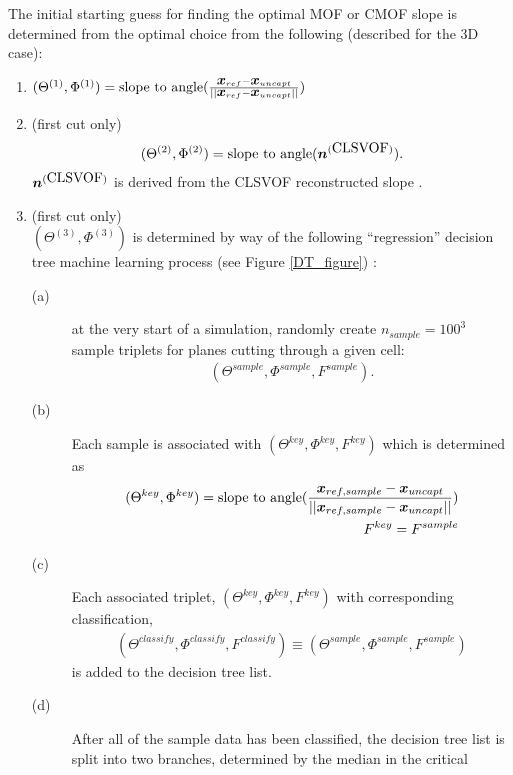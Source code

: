 \documentclass[]{article}
\newcommand{\bmx}{\mbox{\boldmath $x$\unboldmath}}
\newcommand{\bmn}{\mbox{\boldmath $n$\unboldmath}}
\begin{document}
The initial starting guess for finding the optimal MOF or CMOF
slope 
is determined from the optimal choice from the following (described
for the 3D case):
\begin{enumerate}
\item $(\Theta^{(1)},\Phi^{(1)})=\mbox{slope to angle}(\frac{\bmx_{ref}-\bmx_{uncapt}}{||\bmx_{ref}-\bmx_{uncapt}||})$
\item (first cut only) 
\begin{eqnarray}
(\Theta^{(2)},\Phi^{(2)})=\mbox{slope to angle}(\bmn^{(\mbox{CLSVOF})}).
\label{CLSVOFslope}
\end{eqnarray}
   $\bmn^{(\mbox{CLSVOF})}$ is derived from the CLSVOF 
   reconstructed slope \cite{sussman2000coupled}.
\item (first cut only) \\
   $(\Theta^{(3)},\Phi^{(3)})$ 
   is determined by way of the following 
   ``regression'' decision tree \cite{breiman1984classification}
   machine learning process
   (see Figure \ref{DT_figure}) :
   \begin{description}
   \item[(a)] at the very start of a simulation,
    randomly create 
    $n_{sample}=100^{3}$ 
    sample triplets for planes
    cutting through a given cell: 
    \begin{eqnarray*}
    (\Theta^{sample},\Phi^{sample},F^{sample}).  
    \end{eqnarray*}
   \item[(b)] Each sample is 
    associated with 
    $(\Theta^{key},\Phi^{key},F^{key})$ 
    which is determined as
    \begin{eqnarray*}
    (\Theta^{key},\Phi^{key})=
    \mbox{slope to angle}( \frac{\bmx_{ref,sample}-\bmx_{uncapt}}
       {||\bmx_{ref,sample}-\bmx_{uncapt}||} ) \\
    F^{key}=F^{sample}
    \end{eqnarray*}
   \item[(c)] Each associated triplet,
     $(\Theta^{key},\Phi^{key},F^{key})$ 
     with corresponding classification,
     \begin{eqnarray*}
     (\Theta^{classify},\Phi^{classify},F^{classify})\equiv
     (\Theta^{sample},\Phi^{sample},F^{sample})
     \end{eqnarray*}
     is added to the decision tree list.
   \item[(d)] After all of the sample data has been classified, 
     the decision tree list is split into two branches, 
     determined by the median in the critical

\end{description}
\end{enumerate}
\end{document}
